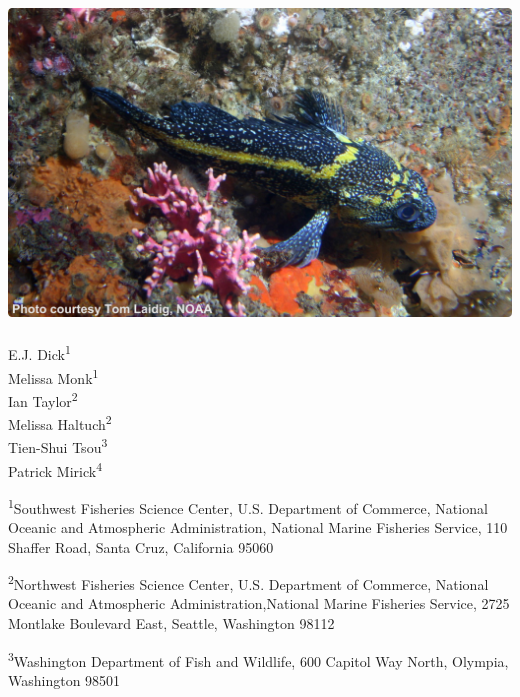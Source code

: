 
\begin{center}
\thispagestyle{empty}


\vspace{.5cm}

\includegraphics{chinarockfish_small}~\\[1cm]



E.J. Dick\textsuperscript{1}\\
Melissa Monk\textsuperscript{1}\\
Ian Taylor\textsuperscript{2}\\
Melissa Haltuch\textsuperscript{2}\\
Tien-Shui Tsou\textsuperscript{3}\\
Patrick Mirick\textsuperscript{4}\\

\vspace{1cm}

\small
\textsuperscript{1}Southwest Fisheries Science Center, U.S. Department of Commerce, National Oceanic and Atmospheric Administration, National Marine Fisheries Service, 110 Shaffer Road, Santa Cruz, California 95060\\

\vspace{.3cm}

\textsuperscript{2}Northwest Fisheries Science Center, U.S. Department of Commerce, National Oceanic and Atmospheric Administration,National Marine Fisheries Service, 2725 Montlake Boulevard East, Seattle, Washington 98112\\

\vspace{.3cm}

\textsuperscript{3}Washington Department of Fish and Wildlife, 600 Capitol Way North, Olympia, Washington 98501\\


\end{center}
